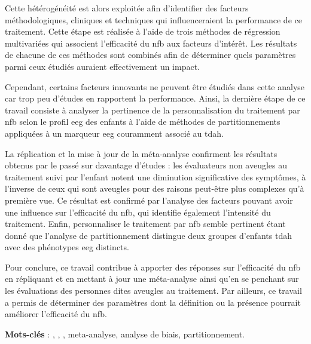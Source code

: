 Cette hétérogénéité est alors exploitée afin d'identifier des facteurs méthodologiques, cliniques et techniques qui influenceraient 
la performance de ce traitement. Cette étape 
est réalisée à l'aide de trois méthodes de régression multivariées qui associent l'efficacité du \gls{nfb} aux facteurs d'intérêt. 
Les résultats de chacune de ces méthodes sont combinés afin de déterminer quels paramètres parmi ceux étudiés auraient effectivement un impact. 

Cependant, certains facteurs innovants ne peuvent être étudiés dans cette analyse car trop peu d'études en rapportent la performance. 
Ainsi, la dernière étape de ce travail consiste à analyser la pertinence de la personnalisation du traitement par \gls{nfb} selon le profil 
\gls{eeg} des enfants à l'aide de méthodes de partitionnements appliquées à un marqueur \gls{eeg} couramment associé au \gls{tdah}. 

La réplication et la mise à jour de la méta-analyse confirment les résultats obtenus par le passé sur davantage d'études : 
les évaluateurs non aveugles au traitement suivi par l'enfant notent une diminution significative des symptômes, à l'inverse 
de ceux qui sont aveugles pour des raisons peut-être plus complexes qu'à première vue. Ce résultat est confirmé par l'analyse 
des facteurs pouvant avoir une influence sur l'efficacité du \gls{nfb}, qui identifie également l'intensité du traitement. Enfin, 
personnaliser le traitement par \gls{nfb} semble pertinent étant donné que l'analyse de partitionnement distingue deux groupes d'enfants 
\gls{tdah} avec des phénotypes \gls{eeg} distincts.

Pour conclure, ce travail contribue à apporter des réponses sur l'efficacité du \gls{nfb} en répliquant et en mettant à jour une méta-analyse 
ainsi qu'en se penchant sur les évaluations des personnes dites aveugles au traitement. Par ailleurs, ce travail a permis de déterminer des paramètres dont la définition ou la présence 
pourrait améliorer l'efficacité du \gls{nfb}.

\large{\textbf{Mots-clés}} : , , , meta-analyse, analyse de biais, partitionnement.